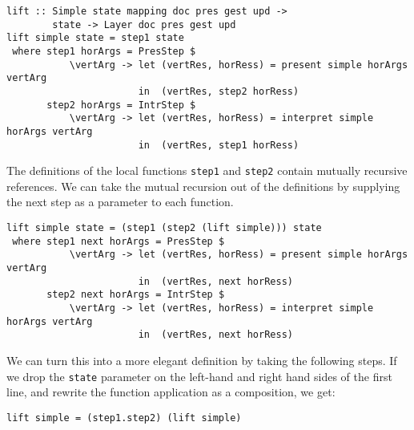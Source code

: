 \begin{small}
\begin{verbatim}
lift :: Simple state mapping doc pres gest upd ->
        state -> Layer doc pres gest upd
lift simple state = step1 state 
 where step1 horArgs = PresStep $ 
           \vertArg -> let (vertRes, horRess) = present simple horArgs vertArg                                         
                       in  (vertRes, step2 horRess)
       step2 horArgs = IntrStep $
           \vertArg -> let (vertRes, horRess) = interpret simple horArgs vertArg                     
                       in  (vertRes, step1 horRess)
\end{verbatim}
\end{small}

The definitions of the local functions \texttt{step1} and \texttt{step2} contain mutually recursive references. We can take the mutual recursion out of the definitions by supplying the next step as a parameter to each function.  

      
\begin{small}
\begin{verbatim}
lift simple state = (step1 (step2 (lift simple))) state 
 where step1 next horArgs = PresStep $ 
           \vertArg -> let (vertRes, horRess) = present simple horArgs vertArg                                         
                       in  (vertRes, next horRess)
       step2 next horArgs = IntrStep $
           \vertArg -> let (vertRes, horRess) = interpret simple horArgs vertArg                     
                       in  (vertRes, next horRess)
\end{verbatim}
\end{small}

We can turn this into a more elegant definition by taking the following steps. If we drop the \texttt{state} parameter  on the left-hand and right hand sides of the first line, and rewrite the function application as a composition, we get:

\begin{small}
\begin{verbatim}
lift simple = (step1.step2) (lift simple)
\end{verbatim}
\end{small}


